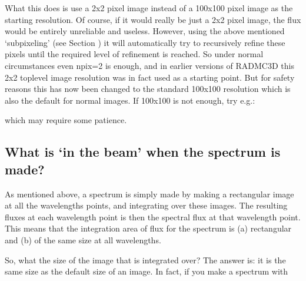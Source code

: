 \documentclass[letterpaper,10pt,english]{sphinxmanual}
\begin{document}
What this does is use a 2x2 pixel image instead of a 100x100 pixel image as the
starting resolution. Of course, if it would really be just a 2x2 pixel image,
the flux would be entirely unreliable and useless. However, using the above
mentioned ‘sub\sphinxhyphen{}pixeling’ (see Section {\hyperref[\detokenize{imagesspectra:sec-recursive-subpixeling}]{}}) it will
automatically try to recursively refine these pixels until the required level of
refinement is reached. So under normal circumstances even npix=2 is enough, and
in earlier versions of RADMC\sphinxhyphen{}3D this 2x2 top\sphinxhyphen{}level image resolution was in fact
used as a starting point. But for safety reasons this has now been changed to
the standard 100x100 resolution which is also the default for normal images. If
100x100 is not enough, try e.g.:

\begin{sphinxVerbatim}[commandchars=\\\{\}]
       
\end{sphinxVerbatim}

which may require some patience.


\subsection{What is ‘in the beam’ when the spectrum is made?}
\label{\detokenize{imagesspectra:what-is-in-the-beam-when-the-spectrum-is-made}}
As mentioned above, a spectrum is simply made by making a rectangular image at
all the wavelengths points, and integrating over these images. The resulting
fluxes at each wavelength point is then the spectral flux at that wavelength
point. This means that the integration area of flux for the spectrum is (a)
rectangular and (b) of the same size at all wavelengths.

So, what  the size of the image that is integrated over? The answer is: it
is the same size as the default size of an image. In fact, if you make a
spectrum with

\begin{sphinxVerbatim}[commandchars=\\\{\}]
          
\end{sphinxVerbatim}
\end{document}
